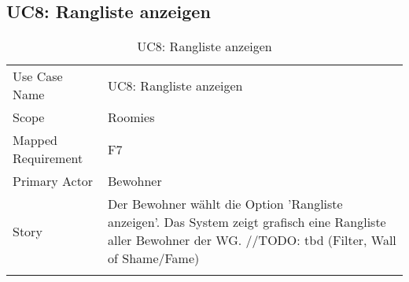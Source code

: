 \subsection{UC8: Rangliste anzeigen}
\begin{table}[H]
	\tablestyle
	\tablealtcolored
	\begin{tabularx}{\textwidth}{lX}
		\tablebody
			Use Case Name &
			UC8: Rangliste anzeigen
			\tabularnewline
			Scope &
			Roomies
			\tabularnewline
			Mapped Requirement &
			F7
			\tabularnewline
			Primary Actor &
			Bewohner
			\tabularnewline
			Story &
			Der Bewohner wählt die Option 'Rangliste anzeigen'. Das System zeigt grafisch eine Rangliste aller Bewohner der WG. \newline //TODO: tbd (Filter, Wall of Shame/Fame)
			\tabularnewline
		\tableend
	\end{tabularx}
	\caption{UC8: Rangliste anzeigen}
\end{table}


